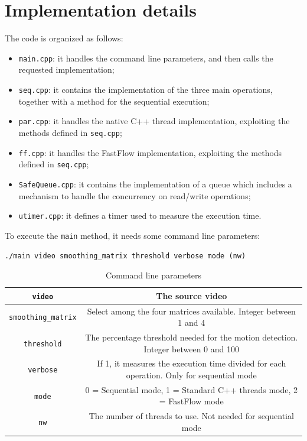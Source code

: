 \section{Implementation details}
The code is organized as follows:

\begin{itemize}
    \item \texttt{main.cpp}: it handles the command line parameters, and then calls the requested implementation;
    \item \texttt{seq.cpp}: it contains the implementation of the three main operations, together with a method for the sequential execution;
    \item \texttt{par.cpp}: it handles the native C++ thread implementation, exploiting the methods defined in \texttt{seq.cpp};
    \item \texttt{ff.cpp}: it handles the FastFlow implementation, exploiting the methods defined in \texttt{seq.cpp};
    \item \texttt{SafeQueue.cpp}: it contains the implementation of a queue which includes a mechanism to handle the concurrency on read/write operations; 
    \item \texttt{utimer.cpp}: it defines a timer used to measure the execution time.
\end{itemize}

To execute the \texttt{main} method, it needs some command line parameters:

\vspace{3mm}
\centerline{\texttt{./main video smoothing\_matrix threshold verbose mode (nw)}}

\begin{table}[h]
    \centering
    \begin{tabular}{| c | c |}
        \hline
        \texttt{video} & The source video\\
        \hline
        \texttt{smoothing\_matrix} & Select among the four matrices available. Integer between 1 and 4\\
        \hline
        \texttt{threshold} & The percentage threshold needed for the motion detection. Integer between 0 and 100\\
        \hline
        \texttt{verbose} & If 1, it measures the execution time divided for each operation. Only for sequential mode\\
        \hline
        \texttt{mode} & 0 = Sequential mode, 1 = Standard C++ threads mode, 2 = FastFlow mode\\
        \hline
        \texttt{nw} & The number of threads to use. Not needed for sequential mode\\
        \hline
    \end{tabular}
    \caption{Command line parameters}
\end{table}

